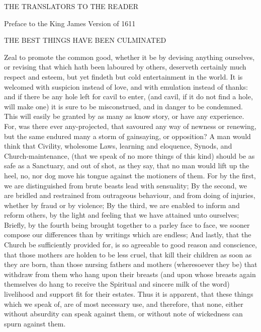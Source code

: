 ﻿\NormalFont{}
{\IMT THE TRANSLATORS TO THE READER
\par }{\IS Preface to the King James Version of 1611
\par }{\IS THE BEST THINGS HAVE BEEN CULMINATED
\par }{\IP Zeal to promote the common good, whether it be by devising anything ourselves, or revising that which hath been laboured by others, deserveth certainly much respect and esteem, but yet findeth but cold entertainment in the world. It is welcomed with suspicion instead of love, and with emulation instead of thanks: and if there be any hole left for cavil to enter, (and cavil, if it do not find a hole, will make one) it is sure to be misconstrued, and in danger to be condemned. This will easily be granted by as many as know story, or have any experience. For, was there ever any-projected, that savoured any way of newness or renewing, but the same endured many a storm of gainsaying, or opposition? A man would think that Civility, wholesome Laws, learning and eloquence, Synods, and Church-maintenance, (that we speak of no more things of this kind) should be as safe as a Sanctuary, and out of shot, as they say, that no man would lift up the heel, no, nor dog move his tongue against the motioners of them. For by the first, we are distinguished from brute beasts lead with sensuality; By the second, we are bridled and restrained from outrageous behaviour, and from doing of injuries, whether by fraud or by violence; By the third, we are enabled to inform and reform others, by the light and feeling that we have attained unto ourselves; Briefly, by the fourth being brought together to a parley face to face, we sooner compose our differences than by writings which are endless; And lastly, that the Church be sufficiently provided for, is so agreeable to good reason and conscience, that those mothers are holden to be less cruel, that kill their children as soon as they are born, than those nursing fathers and mothers (wheresoever they be) that withdraw from them who hang upon their breasts (and upon whose breasts again themselves do hang to receive the Spiritual and sincere milk of the word) livelihood and support fit for their estates. Thus it is apparent, that these things which we speak of, are of most necessary use, and therefore, that none, either without absurdity can speak against them, or without note of wickedness can spurn against them.
}
